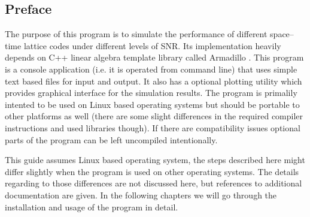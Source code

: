 \documentclass[english,12pt,a4paper,pdftex,sci,utf8]{aaltothesis}
\begin{document}

\subsection{Preface}
The purpose of this program is to simulate the performance of different space--time lattice codes under different levels of SNR. Its implementation heavily depends on C++ linear algebra template library called Armadillo \cite{arma}. This program is a console application (i.e. it is operated from command line) that uses simple text based files for input and output. It also has a optional plotting utility which provides graphical interface for the simulation results. The program is primalily intented to be used on Linux based operating systems but should be portable to other platforms as well (there are some slight differences in the required compiler instructions and used libraries though). If there are compatibility issues optional parts of the program can be left uncompiled intentionally. 
\par This guide assumes Linux based operating system, the steps described here might differ slightly when the program is used on other operating systems. The details regarding to those differences are not discussed here, but references to additional documentation are given. In the following chapters we will go through the installation and usage of the program in detail. 
\end{document}
